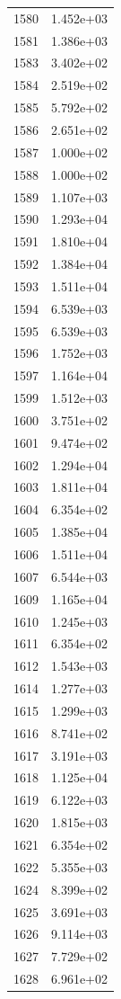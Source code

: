\documentclass[12pt]{article}
\begin{document}
\begin{longtable}{@{}cc@{}}
1580 & 1.452e+03 \\
1581 & 1.386e+03 \\
1583 & 3.402e+02 \\
1584 & 2.519e+02 \\
1585 & 5.792e+02 \\
1586 & 2.651e+02 \\
1587 & 1.000e+02 \\
1588 & 1.000e+02 \\
1589 & 1.107e+03 \\
1590 & 1.293e+04 \\
1591 & 1.810e+04 \\
1592 & 1.384e+04 \\
1593 & 1.511e+04 \\
1594 & 6.539e+03 \\
1595 & 6.539e+03 \\
1596 & 1.752e+03 \\
1597 & 1.164e+04 \\
1599 & 1.512e+03 \\
1600 & 3.751e+02 \\
1601 & 9.474e+02 \\
1602 & 1.294e+04 \\
1603 & 1.811e+04 \\
1604 & 6.354e+02 \\
1605 & 1.385e+04 \\
1606 & 1.511e+04 \\
1607 & 6.544e+03 \\
1609 & 1.165e+04 \\
1610 & 1.245e+03 \\
1611 & 6.354e+02 \\
1612 & 1.543e+03 \\
1614 & 1.277e+03 \\
1615 & 1.299e+03 \\
1616 & 8.741e+02 \\
1617 & 3.191e+03 \\
1618 & 1.125e+04 \\
1619 & 6.122e+03 \\
1620 & 1.815e+03 \\
1621 & 6.354e+02 \\
1622 & 5.355e+03 \\
1624 & 8.399e+02 \\
1625 & 3.691e+03 \\
1626 & 9.114e+03 \\
1627 & 7.729e+02 \\
1628 & 6.961e+02 \\

\end{longtable}
\end{document}
